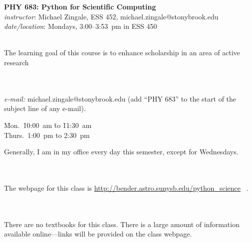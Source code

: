 \documentclass[11pt]{article}
\begin{document}
\begin{center}
{\Large \bf PHY 683: Python for Scientific Computing} \\[0.25em]
{\em instructor}\/: Michael Zingale, ESS 452, michael.zingale@stonybrook.edu \\
{\em date/location}\/: Mondays, 3:00--3:53~pm in ESS 450
\end{center}

 \\
The learning goal of this course is to enhance scholarship in an area
of active research

\ \\
  \\
{\em e-mail:} michael.zingale@stonybrook.edu ({add ``PHY 683'' to the
 start of the subject line of any e-mail}). 
%
\begin{tabbing}
 \= Mon.\ \=10:00~am \=to \=11:30~am \\
                              \> Thurs.\ \>\phantom{0}1:00~pm \>to \>\phantom{0}2:30~pm 
\end{tabbing}
Generally, I am in my office every day this semester, except for Wednesdays.

\ \\
 \\
The webpage for this class is \url{http://bender.astro.sunysb.edu/python_science} \, .

\ \\
 \\
There are no textbooks for this class.  There is a large amount of 
information available online---links will be provided on the class webpage.
\end{document}
